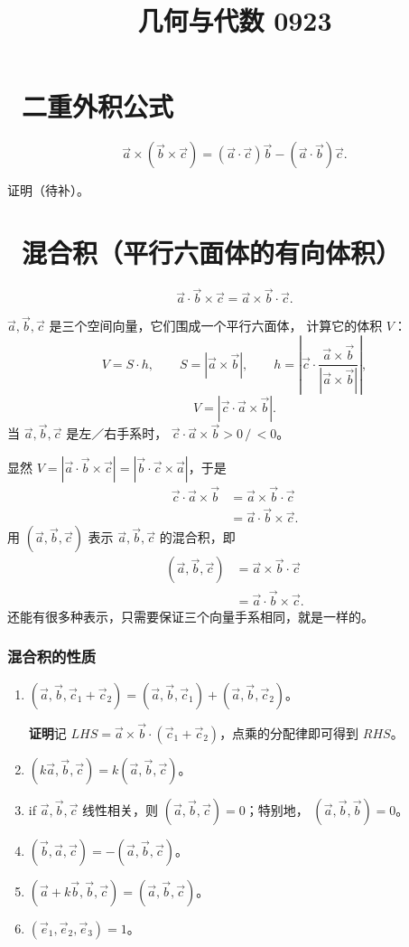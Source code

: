 \documentclass[UTF8,11pt]{ctexart}
\title{几何与代数 0923}
\date{}
\theoremstyle{cnthm}
\begin{document}
\maketitle

\section{\ 二重外积公式}

\[
\vec a\times(\vec b\times\vec c)
=(\vec a\cdot\vec c)\vec b-(\vec a\cdot\vec b)\vec c .
\]

证明（待补）。

\section{\ 混合积（平行六面体的有向体积）}

\[
\vec a\cdot\vec b\times\vec c=\vec a\times\vec b\cdot\vec c .
\]

$\vec a,\vec b,\vec c$ 是三个空间向量，它们围成一个平行六面体，
计算它的体积 $V$：
\[
V=S\cdot h,\qquad S=|\vec a\times\vec b|,\qquad
h=\left|\vec c\cdot\frac{\vec a\times\vec b}{|\vec a\times\vec b|}\right|,
\]
\[
V=|\vec c\cdot\vec a\times\vec b| .
\]
当 $\vec a,\vec b,\vec c$ 是左／右手系时，
$\vec c\cdot\vec a\times\vec b>0\,/\,<0$。

显然
$V=|\vec a\cdot\vec b\times\vec c|
=|\vec b\cdot\vec c\times\vec a|$，于是
\[
\begin{aligned}
\vec c\cdot\vec a\times\vec b
&=\vec a\times\vec b\cdot\vec c\\
&=\vec a\cdot\vec b\times\vec c .
\end{aligned}
\]
用 $(\vec a,\vec b,\vec c)$ 表示 $\vec a,\vec b,\vec c$
的混合积，即
\[
\begin{aligned}
(\vec a,\vec b,\vec c)
&=\vec a\times\vec b\cdot\vec c\\
&=\vec a\cdot\vec b\times\vec c .
\end{aligned}
\]
还能有很多种表示，只需要保证三个向量手系相同，就是一样的。

\subsubsection*{混合积的性质}

\begin{enumerate}
\item $(\vec a,\vec b,\vec c_1+\vec c_2)
=(\vec a,\vec b,\vec c_1)+(\vec a,\vec b,\vec c_2)$。

\textbf{证明}\quad 记 $LHS=\vec a\times\vec b\cdot
(\vec c_1+\vec c_2)$，点乘的分配律即可得到 $RHS$。
\item $(k\vec a,\vec b,\vec c)=k(\vec a,\vec b,\vec c)$。
\item if $\vec a,\vec b,\vec c$ 线性相关，则
$(\vec a,\vec b,\vec c)=0$；特别地，
$(\vec a,\vec b,\vec b)=0$。
\item $(\vec b,\vec a,\vec c)=-(\vec a,\vec b,\vec c)$。
\item $(\vec a+k\vec b,\vec b,\vec c)=(\vec a,\vec b,\vec c)$。
\item $(\vec e_1,\vec e_2,\vec e_3)=1$。
\end{enumerate}
\end{document}
